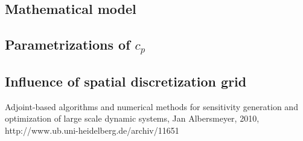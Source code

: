 \documentclass{scrartcl}[12pt, halfparskip]
\begin{document}
\subsection{Mathematical model}
\subsection{Parametrizations of $c_p$}
\subsection{Influence of spatial discretization grid}




\begin{thebibliography}{9}

	 Adjoint-based algorithms and numerical methods for sensitivity generation and optimization of large scale dynamic systems, 
	 Jan Albersmeyer, 2010,
	 http://www.ub.uni-heidelberg.de/archiv/11651

  
\end{thebibliography}
\end{document}
